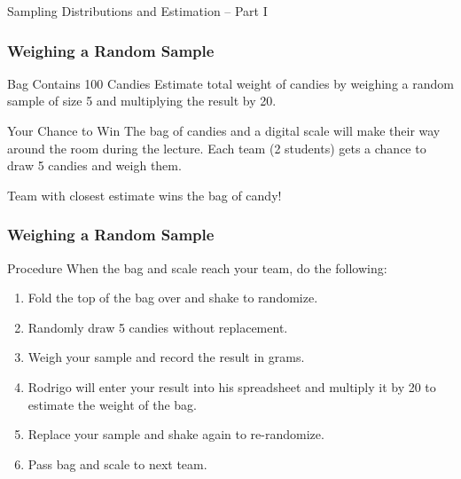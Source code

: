 \documentclass[handout]{beamer}
\date{Lecture \# 14}
\begin{document}
 


\begin{frame}[plain]
	\titlepage 
	

\end{frame} 



\begin{frame}
\begin{center}
\Huge Sampling Distributions and Estimation -- Part I
\end{center}
\end{frame}

\begin{frame}
\frametitle{Weighing a Random Sample}
\begin{block}{Bag Contains 100 Candies}
Estimate total weight of candies by weighing a random sample of size 5 and multiplying the result by 20.
\end{block}
\begin{block}{Your Chance to Win}
The bag of candies and a digital scale will make their way around the room \alert{during the lecture}. Each team (2 students) gets a chance to draw 5 candies and weigh them.
\end{block}
\begin{alertblock}{Team with closest estimate wins the bag of candy!}
\end{alertblock}

\end{frame}
\begin{frame}
\frametitle{Weighing a Random Sample}
\begin{block}{Procedure}
When the bag and scale reach your team, do the following:
\end{block}
\begin{enumerate}
\item Fold the top of the bag over and shake to randomize.
\item Randomly draw 5 candies \alert{without replacement}.
\item Weigh your sample and record the result \alert{in grams}.
\item Rodrigo will enter your result into his spreadsheet and multiply it by 20 to estimate the weight of the bag.
\item Replace your sample and shake again to re-randomize.
\item Pass bag and scale to next team.
\end{enumerate}
\end{frame}
\end{document}
